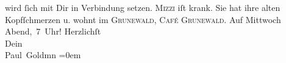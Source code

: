 \begin{ledgroupsized}[t]{13cm}
               wird ſich mit Dir in Verbindung setzen.\pend
           \pstart
           \textsc{Mizzi} iſt krank. Sie {\pb}hat ihre alten Kopfſchmerzen
               u. wohnt im \textsc{Grunewald}, \textsc{Café Grunewald}.\pend
           \pstart
           Auf Mittwoch{ }Abend, 7 Uhr!\pend
           \pstart
           Herzlichſt {\\[\baselineskip]}Dein {\\[\baselineskip]}\spacefill\mbox{Paul Goldmn}\pend
           \leftskip=0em{}
         
         \endnumbering{}\end{ledgroupsized}  \newcommand{\dateiname}{L03227}\newcommand{\titel}{Paul Goldmann an Arthur Schnitzler, 14. 10. [1902]}\newcommand{\editorInnen}{Martin Anton Müller und Laura Untner}
      